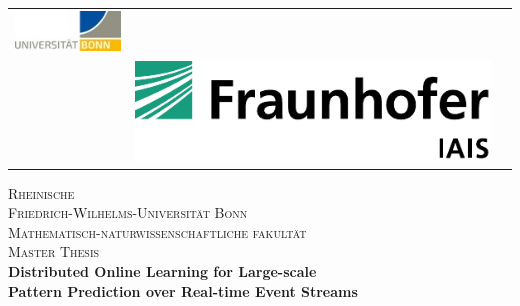 \begin{titlepage}
		\begin{center}
			\setlength{\tabcolsep}{0pt}
			\begin{tabular}{>{\raggedleft}m{2.5cm}>{\centering}m{\dimexpr\textwidth - 5cm\relax}>{\raggedright}m{2.5cm}}
				\includegraphics[width=\linewidth]{chapters/figures/uni-bonn.jpeg}%
				&%
				\textbf{\large } \\[5pt]%
				\textbf{\large}%
				&%
				\includegraphics[width=\linewidth]{chapters/figures/iais.pdf} %
			\end{tabular}
			
			
			\textsc{\LARGE Rheinische\\[5mm] Friedrich-Wilhelms-Universität Bonn}\\[1.0cm]
			
			\textsc{\Large Mathematisch-naturwissenschaftliche fakultät}\\[1.0cm]
			
			\textsc{\Large Master Thesis}\\[1.5cm]
			
			{ \Large \bfseries 
				Distributed Online Learning for Large-scale  \\Pattern Prediction over Real-time Event Streams}\\[2.9cm]
			

\end{center}
\end{titlepage}
